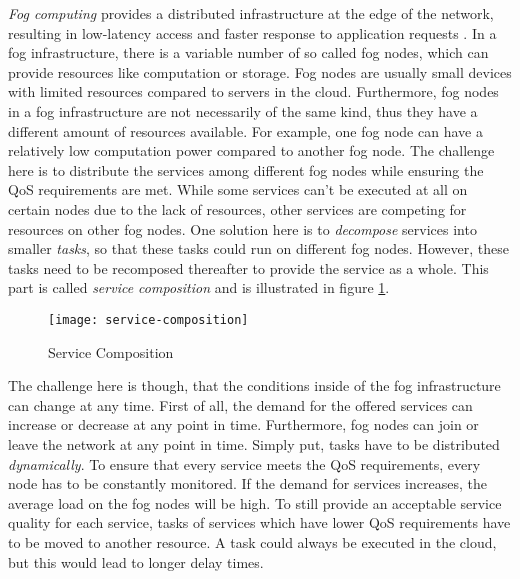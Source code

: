 \textit{Fog computing} provides a distributed infrastructure at the edge of the network, resulting in low-latency access and faster response to application requests \cite{mobility-aware-scheduling}.
In a fog infrastructure, there is a variable number of so called fog nodes, which can provide resources like computation or storage.
Fog nodes are usually small devices with limited resources compared to servers in the cloud.
Furthermore, fog nodes in a fog infrastructure are not necessarily of the same kind, thus they have a different amount of resources available.
For example, one fog node can have a relatively low computation power compared to another fog node.
The challenge here is to distribute the services among different fog nodes while ensuring the QoS requirements are met.
While some services can’t be executed at all on certain nodes due to the lack of resources, other services are competing for resources on other fog nodes.
One solution here is to \textit{decompose} services into smaller \textit{tasks}, so that these tasks could run on different fog nodes.
However, these tasks need to be recomposed thereafter to provide the service as a whole.
This part is called \textit{service composition} and is illustrated in figure \ref{fig:service-composition}.\\

\begin{figure}
    \centering
    \texttt{[image: service-composition]}
    \caption{Service Composition}
    \label{fig:service-composition}
\end{figure}

The challenge here is though, that the conditions inside of the fog infrastructure can change at any time.
First of all, the demand for the offered services can increase or decrease at any point in time.
Furthermore, fog nodes can join or leave the network at any point in time.
Simply put, tasks have to be distributed \textit{dynamically}.
To ensure that every service meets the QoS requirements, every node has to be constantly monitored.
If the demand for services increases, the average load on the fog nodes will be high.
To still provide an acceptable service quality for each service, tasks of services which have lower QoS requirements have to be moved to another resource.
A task could always be executed in the cloud, but this would lead to longer delay times.